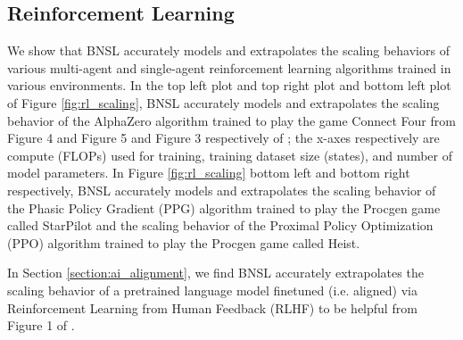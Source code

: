 \documentclass{article} %
\begin{document}
\vspace{-3.9mm}

\subsection{Reinforcement Learning}
\label{section:reinforcement_learning}

\vspace{-3.9mm}

We show that BNSL accurately models and extrapolates the scaling behaviors of various multi-agent and single-agent reinforcement learning algorithms trained in various environments. In the top left plot and top right plot and bottom left plot of Figure \ref{fig:rl_scaling}, BNSL accurately models and extrapolates the scaling behavior of the AlphaZero algorithm trained to play the game Connect Four from Figure 4 and Figure 5 and Figure 3 respectively of \cite{neumann2022scaling}; the x-axes respectively are compute (FLOPs) used for training, training dataset size (states), and number of model parameters. In Figure \ref{fig:rl_scaling} bottom left and bottom right respectively, BNSL accurately models and extrapolates the scaling behavior of the Phasic Policy Gradient (PPG) algorithm \citep{cobbe2021phasic} trained to play the Procgen \citep{cobbe2020leveraging} game called StarPilot and the scaling behavior of the Proximal Policy Optimization (PPO) algorithm \citep{schulman2017proximal} trained to play the Procgen \citep{cobbe2020leveraging} game called Heist.

In Section \ref{section:ai_alignment}, we find BNSL accurately extrapolates the scaling behavior of a pretrained language model finetuned (i.e. aligned) via Reinforcement Learning from Human Feedback (RLHF) to be helpful from Figure 1 of \cite{bai2022training}.
\end{document}
